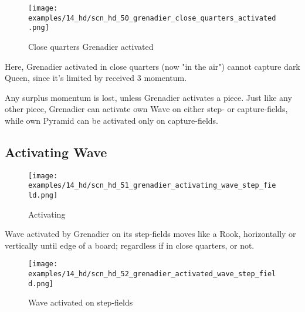 \vspace*{-1.2\baselineskip}
\noindent
\begin{figure}[!h]
\texttt{[image: examples/14\_hd/scn\_hd\_50\_grenadier\_close\_quarters\_activated.png]}
\vspace*{-1.4\baselineskip}
\caption{Close quarters Grenadier activated}
\label{fig:scn_hd_50_grenadier_close_quarters_activated}
\end{figure}

\vspace*{-0.5\baselineskip}
Here, Grenadier activated in close quarters (now "in the air") cannot capture dark
Queen, since it's limited by received 3 momentum.

Any surplus momentum is lost, unless Grenadier activates a piece. Just like any other
piece, Grenadier can activate own Wave on either step- or capture-fields, while own
Pyramid can be activated only on capture-fields.

\clearpage %

\subsection*{Activating Wave}
\label{sec:Hemera's Dawn/Grenadier/Activating Wave}

\vspace*{-1.1\baselineskip}
\noindent
\begin{wrapfigure}[5]{l}{0.4\textwidth}
\centering
\texttt{[image: examples/14\_hd/scn\_hd\_51\_grenadier\_activating\_wave\_step\_field.png]}
\vspace*{-0.5\baselineskip}
\caption{Activating}
\label{fig:scn_hd_51_grenadier_activating_wave_step_field}
\end{wrapfigure}
Wave activated by Grenadier on its step-fields moves like a Rook, horizontally or
vertically until edge of a board; regardless if in close quarters, or not.

\vspace*{-1.1\baselineskip}
\noindent
\begin{figure}[!h]
\texttt{[image: examples/14\_hd/scn\_hd\_52\_grenadier\_activated\_wave\_step\_field.png]}
\vspace*{-1.4\baselineskip}
\caption{Wave activated on step-fields}
\label{fig:scn_hd_52_grenadier_activated_wave_step_field}
\end{figure}

